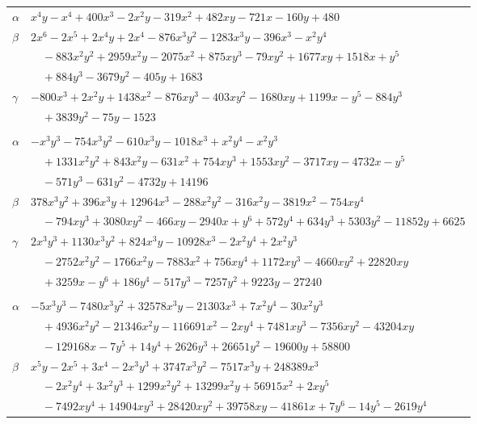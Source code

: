 \documentclass[11pt]{article}
\begin{document}
\begin{longtable}{@{}ll@{}}
$\alpha$ & $x^{4}y-x^{4}+400x^{3}-2x^{2}y-319x^{2}+482xy-721x-160y+480$\\
$\beta$ & $2x^{6}-2x^{5}+2x^{4}y+2x^{4}-876x^{3}y^{2}-1283x^{3}y-396x^{3}-x^{2}y^{4}$\\
 & $\quad -883x^{2}y^{2}+2959x^{2}y-2075x^{2}+875xy^{3}-79xy^{2}+1677xy+1518x+y^{5}$\\
 & $\quad +884y^{3}-3679y^{2}-405y+1683$\\
$\gamma$ & $-800x^{3}+2x^{2}y+1438x^{2}-876xy^{3}-403xy^{2}-1680xy+1199x-y^{5}-884y^{3}$\\
 & $\quad +3839y^{2}-75y-1523$\\
\addlinespace[3pt]
\multicolumn{2}{@{}l}{$\{i,j\}=\{120,152\}$, $k_{ij}=2^{2}\cdot 3^{2}\cdot 7\cdot 13^{2}$}\\
$\alpha$ & $-x^{3}y^{3}-754x^{3}y^{2}-610x^{3}y-1018x^{3}+x^{2}y^{4}-x^{2}y^{3}$\\
 & $\quad +1331x^{2}y^{2}+843x^{2}y-631x^{2}+754xy^{3}+1553xy^{2}-3717xy-4732x-y^{5}$\\
 & $\quad -571y^{3}-631y^{2}-4732y+14196$\\
$\beta$ & $378x^{3}y^{2}+396x^{3}y+12964x^{3}-288x^{2}y^{2}-316x^{2}y-3819x^{2}-754xy^{4}$\\
 & $\quad -794xy^{3}+3080xy^{2}-466xy-2940x+y^{6}+572y^{4}+634y^{3}+5303y^{2}-11852y+6625$\\
$\gamma$ & $2x^{3}y^{3}+1130x^{3}y^{2}+824x^{3}y-10928x^{3}-2x^{2}y^{4}+2x^{2}y^{3}$\\
 & $\quad -2752x^{2}y^{2}-1766x^{2}y-7883x^{2}+756xy^{4}+1172xy^{3}-4660xy^{2}+22820xy$\\
 & $\quad +3259x-y^{6}+186y^{4}-517y^{3}-7257y^{2}+9223y-27240$\\
\addlinespace[3pt]
\multicolumn{2}{@{}l}{$\{i,j\}=\{120,161\}$, $k_{ij}=2^{4}\cdot 3^{2}\cdot 5^{2}\cdot 7^{2}$}\\
$\alpha$ & $-5x^{3}y^{3}-7480x^{3}y^{2}+32578x^{3}y-21303x^{3}+7x^{2}y^{4}-30x^{2}y^{3}$\\
 & $\quad +4936x^{2}y^{2}-21346x^{2}y-116691x^{2}-2xy^{4}+7481xy^{3}-7356xy^{2}-43204xy$\\
 & $\quad -129168x-7y^{5}+14y^{4}+2626y^{3}+26651y^{2}-19600y+58800$\\
$\beta$ & $x^{5}y-2x^{5}+3x^{4}-2x^{3}y^{3}+3747x^{3}y^{2}-7517x^{3}y+248389x^{3}$\\
 & $\quad -2x^{2}y^{4}+3x^{2}y^{3}+1299x^{2}y^{2}+13299x^{2}y+56915x^{2}+2xy^{5}$\\
 & $\quad -7492xy^{4}+14904xy^{3}+28420xy^{2}+39758xy-41861x+7y^{6}-14y^{5}-2619y^{4}$\\

\end{longtable}
\end{document}
